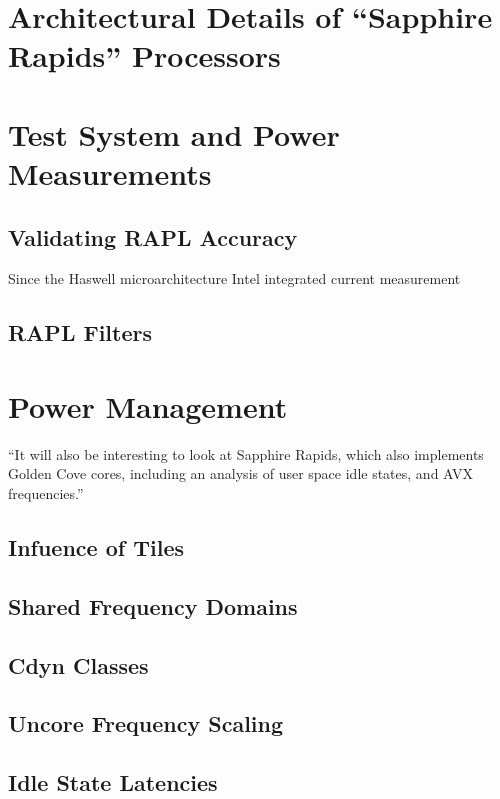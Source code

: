 \documentclass[conference,table,xcdraw,10pt,final]{IEEEtran}
\begin{document}
	\cite{Schoene_2019_SKL}

	\section{Architectural Details of “Sapphire Rapids” Processors}

	\section{Test System and Power Measurements}

	\subsection{Validating RAPL Accuracy}
	Since the Haswell microarchitecture Intel integrated current measurement 

	\subsection{RAPL Filters}

	\section{Power Management}
	``It will also be interesting to look at Sapphire Rapids, which also implements Golden Cove cores, including an analysis of user space idle states, and AVX frequencies.''

	\subsection{Infuence of Tiles}

	\subsection{Shared Frequency Domains}

	\subsection{Cdyn Classes}

	\subsection{Uncore Frequency Scaling}

	\subsection{Idle State Latencies}
\end{document}
